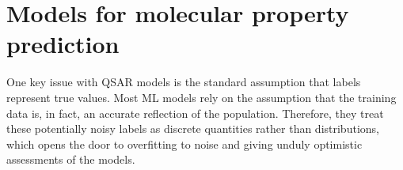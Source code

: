 \section{Models for molecular property prediction}

One key issue with QSAR models is the standard assumption that labels represent true values. Most ML models rely on the assumption that the training data is, in fact, an accurate reflection of the population. Therefore, they treat these potentially noisy labels as discrete quantities rather than distributions, which opens the door to overfitting to noise and giving unduly optimistic assessments of the models.

